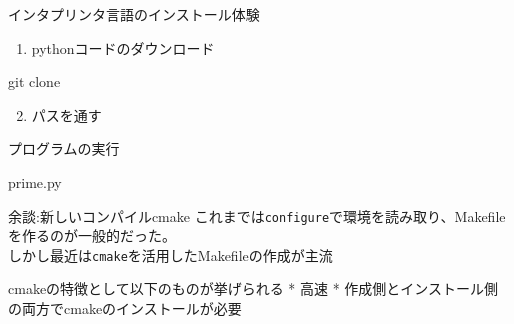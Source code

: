 \documentclass[
  ignorenonframetext,
]{beamer}
\newenvironment{Shaded}{\begin{snugshade}}{\end{snugshade}}
\newcommand{\BuiltInTok}[1]{\textcolor[rgb]{0.00,0.23,0.31}{#1}}
\newcommand{\CommentTok}[1]{\textcolor[rgb]{0.37,0.37,0.37}{#1}}
\newcommand{\ExtensionTok}[1]{\textcolor[rgb]{0.00,0.23,0.31}{#1}}
\newcommand{\FunctionTok}[1]{\textcolor[rgb]{0.28,0.35,0.67}{#1}}
\newcommand{\NormalTok}[1]{\textcolor[rgb]{0.00,0.23,0.31}{#1}}
\newcommand{\OperatorTok}[1]{\textcolor[rgb]{0.37,0.37,0.37}{#1}}
\newcommand{\StringTok}[1]{\textcolor[rgb]{0.13,0.47,0.30}{#1}}
\newcommand{\VariableTok}[1]{\textcolor[rgb]{0.07,0.07,0.07}{#1}}
\providecommand{\tightlist}{%
  \setlength{\itemsep}{0pt}\setlength{\parskip}{0pt}}\usepackage{longtable,booktabs,array}
\begin{document}
\begin{frame}[fragile]{インタプリンタ言語のインストール体験}
\protect\hypertarget{ux30a4ux30f3ux30bfux30d7ux30eaux30f3ux30bfux8a00ux8a9eux306eux30a4ux30f3ux30b9ux30c8ux30fcux30ebux4f53ux9a13}{}
\begin{enumerate}[<+->]
\tightlist
\item
  pythonコードのダウンロード
\end{enumerate}

\begin{Shaded}
\begin{Highlighting}[]
\FunctionTok{git}\NormalTok{ clone}
\end{Highlighting}
\end{Shaded}

\begin{enumerate}[<+->]
\setcounter{enumi}{1}
\tightlist
\item
  パスを通す
\end{enumerate}

\begin{Shaded}
\end{Shaded}

プログラムの実行

\begin{Shaded}
\begin{Highlighting}[]
\ExtensionTok{prime.py}
\end{Highlighting}
\end{Shaded}
\end{frame}

\begin{frame}[fragile]{余談:新しいコンパイルcmake}
\protect\hypertarget{ux4f59ux8ac7ux65b0ux3057ux3044ux30b3ux30f3ux30d1ux30a4ux30ebcmake}{}
これまでは\texttt{configure}で環境を読み取り、Makefileを作るのが一般的だった。\\
しかし最近は\texttt{cmake}を活用したMakefileの作成が主流

cmakeの特徴として以下のものが挙げられる * 高速 *
作成側とインストール側の両方でcmakeのインストールが必要
\end{frame}
\end{document}
